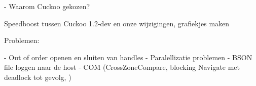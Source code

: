 - Waarom Cuckoo gekozen?

Speedboost tussen Cuckoo 1.2-dev en onze wijzigingen, grafiekjes maken

Problemen:

- Out of order openen en sluiten van handles 
- Paralellizatie problemen
- BSON file loggen naar de host
- COM (CrossZoneCompare, blocking Navigate met deadlock tot gevolg, )